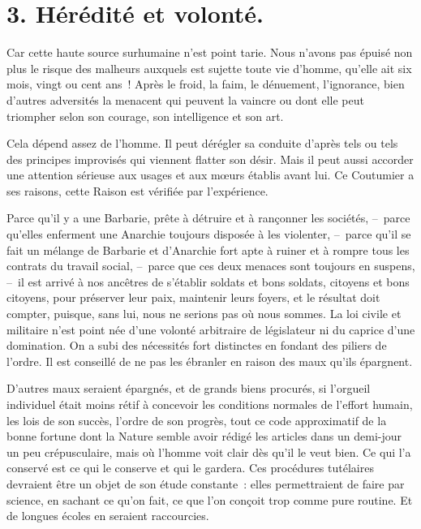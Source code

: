 \documentclass[french,twoside]{book} %
\begin{document}
\section[3. Hérédité et volonté.]{3. Hérédité et volonté.}
\noindent Car cette haute source surhumaine n’est point tarie. Nous n’avons pas épuisé non plus le risque des malheurs auxquels est sujette toute vie d’homme, qu’elle ait six mois, vingt ou cent ans ! Après le froid, la faim, le dénuement, l’ignorance, bien d’autres adversités la menacent qui peuvent la vaincre ou dont elle peut triompher selon son courage, son intelligence et son art.\par
Cela dépend assez de l’homme. Il peut dérégler sa conduite d’après tels ou tels des principes improvisés qui viennent flatter son désir. Mais il peut aussi accorder une attention sérieuse aux usages et aux mœurs établis avant lui. Ce Coutumier a ses raisons, cette Raison est vérifiée par l’expérience.\par
Parce qu’il y a une Barbarie, prête à détruire et à rançonner les sociétés, – parce qu’elles enferment une Anarchie toujours disposée à les violenter, – parce qu’il se fait un mélange de Barbarie et d’Anarchie fort apte à ruiner et à rompre tous les contrats du travail social, – parce que ces deux menaces sont toujours en suspens, – il est arrivé à nos ancêtres de s’établir soldats et bons soldats, citoyens et bons citoyens, pour préserver leur paix, maintenir leurs foyers, et le résultat doit compter, puisque, sans lui, nous ne serions pas où nous sommes. La loi civile et militaire n’est point née d’une volonté arbitraire de législateur ni du caprice d’une domination. On a subi des nécessités fort distinctes en fondant des piliers de l’ordre. Il est conseillé de ne pas les ébranler en raison des maux qu’ils épargnent.\par
D’autres maux seraient épargnés, et de grands biens procurés, si l’orgueil individuel était moins rétif à concevoir les conditions normales de l’effort humain, les lois de son succès, l’ordre de son progrès, tout ce code approximatif de la bonne fortune dont la Nature semble avoir rédigé les articles dans un demi-jour un peu crépusculaire, mais où l’homme voit clair dès qu’il le veut bien. Ce qui l’a conservé est ce qui le conserve et qui le gardera. Ces procédures tutélaires devraient être un objet de son étude constante : elles permettraient de faire par science, en sachant ce qu’on fait, ce que l’on conçoit trop comme pure routine. Et de longues écoles en seraient raccourcies.\par
\end{document}
